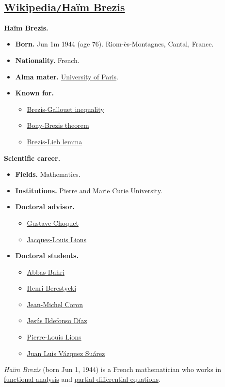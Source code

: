 \documentclass{article}
\begin{document}
\subsection{\href{https://en.wikipedia.org/wiki/Haim_Brezis}{Wikipedia\texttt{/}Ha\"im Brezis}}
\textbf{Haïm Brezis.}
\begin{itemize}
	\item \textbf{Born.} Jun 1m 1944 (age 76). Riom-ès-Montagnes, Cantal, France.
	\item \textbf{Nationality.} French.
	\item \textbf{Alma mater.} \href{https://en.wikipedia.org/wiki/University_of_Paris}{University of Paris}.
	\item \textbf{Known for.}
	\begin{itemize}
		\item \href{https://en.wikipedia.org/wiki/Brezis-Gallouet_inequality}{Brezis-Gallouet inequality}
		\item \href{https://en.wikipedia.org/wiki/Bony-Brezis_theorem}{Bony-Brezis theorem}
		\item \href{https://en.wikipedia.org/wiki/Brezis-Lieb_lemma}{Brezis-Lieb lemma}
	\end{itemize}
\end{itemize}
\textbf{Scientific career.}
\begin{itemize}
	\item \textbf{Fields.} Mathematics.
	\item \textbf{Institutions.} \href{https://en.wikipedia.org/wiki/Pierre_and_Marie_Curie_University}{Pierre and Marie Curie University}.
	\item \textbf{Doctoral advisor.}
	\begin{itemize}
		\item \href{https://en.wikipedia.org/wiki/Gustave_Choquet}{Gustave Choquet}
		\item \href{https://en.wikipedia.org/wiki/Jacques-Louis_Lions}{Jacques-Louis Lions}
	\end{itemize}
	\item \textbf{Doctoral students.}
	\begin{itemize}
		\item \href{https://en.wikipedia.org/wiki/Abbas_Bahri}{Abbas Bahri}
		\item \href{https://en.wikipedia.org/wiki/Jean-Michel_Coron}{Henri Berestycki}
		\item \href{https://en.wikipedia.org/wiki/Jean-Michel_Coron}{Jean-Michel Coron}
		\item \href{https://en.wikipedia.org/wiki/Jes%C3%BAs_Ildefonso_D%C3%ADaz}{Jes\'us Ildefonso D\'iaz}
		\item \href{https://en.wikipedia.org/wiki/Pierre-Louis_Lions}{Pierre-Louis Lions}
		\item \href{https://en.wikipedia.org/wiki/Juan_Luis_V%C3%A1zquez_Su%C3%A1rez}{Juan Luis V\'azquez Su\'arez}
	\end{itemize}
\end{itemize}
\textit{Haïm Brezis} (born Jun 1, 1944) is a French mathematician who works in \href{https://en.wikipedia.org/wiki/Functional_analysis}{functional analysis} and \href{https://en.wikipedia.org/wiki/Partial_differential_equation}{partial differential equations}.
\end{document}
